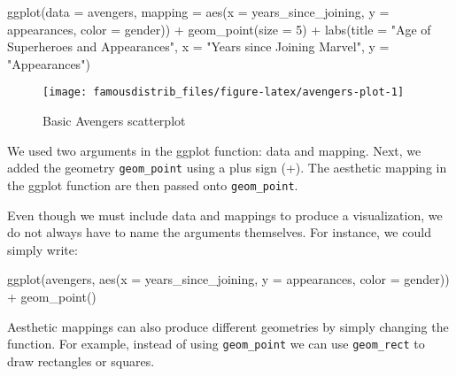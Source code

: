 \documentclass[
]{article}
\newenvironment{Shaded}{\begin{snugshade}}{\end{snugshade}}
\newcommand{\AttributeTok}[1]{\textcolor[rgb]{0.77,0.63,0.00}{#1}}
\newcommand{\DecValTok}[1]{\textcolor[rgb]{0.00,0.00,0.81}{#1}}
\newcommand{\FunctionTok}[1]{\textcolor[rgb]{0.00,0.00,0.00}{#1}}
\newcommand{\NormalTok}[1]{#1}
\newcommand{\SpecialCharTok}[1]{\textcolor[rgb]{0.00,0.00,0.00}{#1}}
\newcommand{\StringTok}[1]{\textcolor[rgb]{0.31,0.60,0.02}{#1}}
\begin{document}
\begin{Shaded}
\begin{Highlighting}[]
\FunctionTok{ggplot}\NormalTok{(}\AttributeTok{data =}\NormalTok{ avengers, }\AttributeTok{mapping =} \FunctionTok{aes}\NormalTok{(}\AttributeTok{x =}\NormalTok{ years\_since\_joining,}
                                      \AttributeTok{y =}\NormalTok{ appearances,}
                                      \AttributeTok{color =}\NormalTok{ gender)) }\SpecialCharTok{+}
  \FunctionTok{geom\_point}\NormalTok{(}\AttributeTok{size =} \DecValTok{5}\NormalTok{) }\SpecialCharTok{+}
  \FunctionTok{labs}\NormalTok{(}\AttributeTok{title =} \StringTok{"\textquotesingle{}Age\textquotesingle{} of Superheroes and Appearances"}\NormalTok{,}
       \AttributeTok{x =} \StringTok{"Years since Joining Marvel"}\NormalTok{,}
       \AttributeTok{y =} \StringTok{"Appearances"}\NormalTok{)}
\end{Highlighting}
\end{Shaded}

\begin{figure}

{\centering \texttt{[image: famousdistrib\_files/figure-latex/avengers-plot-1]} 

}

\caption{Basic Avengers scatterplot}\label{fig:avengers-plot}
\end{figure}

We used two arguments in the ggplot function: data and mapping. Next, we added the geometry \texttt{geom\_point} using a plus sign (+). The aesthetic mapping in the ggplot function are then passed onto \texttt{geom\_point}.

Even though we must include data and mappings to produce a visualization, we do not always have to name the arguments themselves. For instance, we could simply write:

\begin{Shaded}
\begin{Highlighting}[]
\FunctionTok{ggplot}\NormalTok{(avengers, }\FunctionTok{aes}\NormalTok{(}\AttributeTok{x =}\NormalTok{ years\_since\_joining,}
                     \AttributeTok{y =}\NormalTok{ appearances,}
                     \AttributeTok{color =}\NormalTok{ gender)) }\SpecialCharTok{+}
  \FunctionTok{geom\_point}\NormalTok{()}
\end{Highlighting}
\end{Shaded}

Aesthetic mappings can also produce different geometries by simply changing the function. For example, instead of using \texttt{geom\_point} we can use \texttt{geom\_rect} to draw rectangles or squares.
\end{document}
